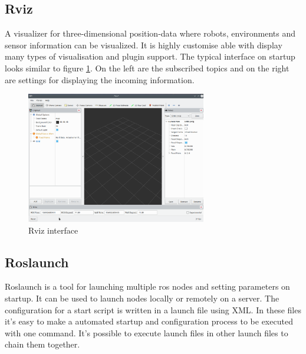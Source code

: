 \subsection{Rviz}\label{rviz}
A visualizer for three-dimensional position-data where robots, environments and sensor information can be visualized. It is highly customise able with display many types of visualisation and plugin support. The typical interface on startup looks similar to figure \ref{rvizinterface}. On the left are the subscribed topics and on the right are settings for displaying the incoming information. \newline
\begin{figure}[h]
	\centering
	\includegraphics[width=0.7\textwidth]{./media/images/rviz}
  	\caption{Rviz interface}
  	\label{rvizinterface}
\end{figure}

\subsection{Roslaunch}\label{roslaunch}
Roslaunch is a tool for launching multiple \gls{ros} nodes and setting parameters on startup. It can be used to launch nodes locally or remotely on a server.
The configuration for a start script is written in a launch file using XML. In these files it's easy to make a automated startup and configuration process to be executed with one command. It's possible to execute launch files in other launch files to chain them together.